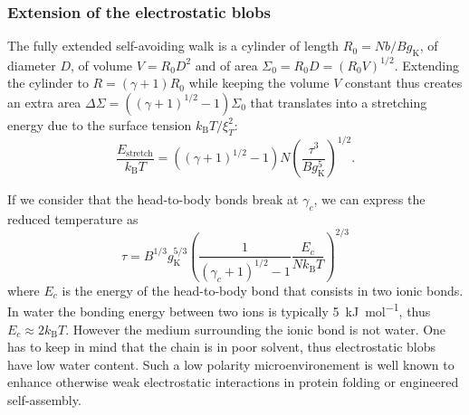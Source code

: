 \documentclass[journal=jacsat,manuscript=article]{achemso}
\begin{document}
%

\subsubsection{Extension of the electrostatic blobs}

The fully extended self-avoiding walk is a cylinder of length $R_0 = Nb/Bg_\mathrm{K}$, of diameter $D$, of volume $V = R_0 D^2$ and of area $\Sigma_0 = R_0 D = (R_0 V)^{1/2}$. Extending the cylinder to $R = (\gamma+1) R_0$ while keeping the volume $V$ constant thus creates an extra area 
$
\Delta\Sigma = \left(\left(\gamma +1\right)^{1/2} -1\right) \Sigma_0
$
that translates into a stretching energy due to the surface tension $k_\mathrm{B}T/\xi_T^2$:
\begin{equation}
\frac{E_\mathrm{stretch}}{k_\mathrm{B}T} = \left(\left(\gamma +1\right)^{1/2} -1\right) N \left(\frac{\tau^3}{B g_\mathrm{K}^5}\right)^{1/2}.
\label{eq:stretch}
\end{equation}

If we consider that the head-to-body bonds break at $\gamma_c$, we can express the reduced temperature as
\begin{equation}
\tau = B^{1/3} g_\mathrm{K}^{5/3} \left(\frac{1}{(\gamma_c +1)^{1/2} -1}\frac{E_c}{N k_\mathrm{B}T}\right)^{2/3}
\label{eq:tau}
\end{equation}
where $E_c$ is the energy of the head-to-body bond that consists in two ionic bonds. In water the bonding energy between two ions is typically \SI{5}{\kilo\joule\per\mole}\cite{Schneider1992}, thus $E_c\approx 2 k_\mathrm{B}T$. However the medium surrounding the ionic bond is not water. One has to keep in mind that the chain is in poor solvent, thus electrostatic blobs have low water content. Such a low polarity microenvironement is well known to enhance otherwise weak electrostatic interactions in protein folding or engineered self-assembly\cite{Rehm2010}. 
\end{document}
